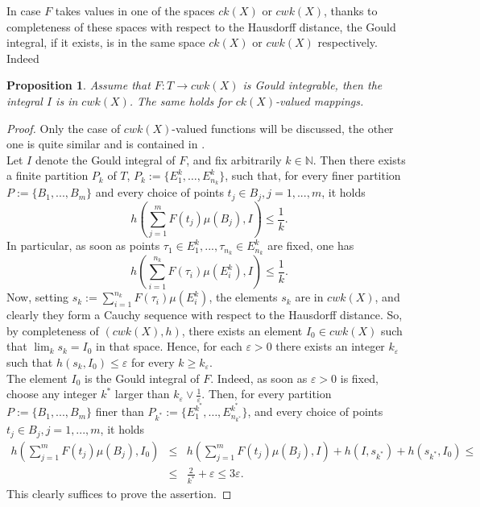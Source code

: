\documentclass[11pt,a4paper,twoside]{amsart}
\newtheorem{proposition}[theorem]{Proposition}
\begin{document}
\noindent In case $F$ takes values in one of the spaces $ck(X)$ or $cwk(X)$, thanks to completeness of these spaces with respect to the Hausdorff distance, the Gould integral, if it exists, is in the same space $ck(X)$ or $cwk(X)$ respectively. Indeed
\begin{proposition}\label{integraleck}
Assume that $F:T\to cwk(X)$ is Gould integrable, then the integral $I$ is in $cwk(X)$. The same holds for $ck(X)$-valued mappings.
\end{proposition}
\begin{proof}
Only the case of $cwk(X)$-valued functions will be discussed, the other one is quite similar and is contained in \cite[Remark 3.7]{pgcsub}.\\
Let $I$ denote the Gould integral of $F$, and fix arbitrarily $k\in \mathbb{N}$. Then there exists a finite partition 
$P_k$ of $T$, $P_k:=\{E_1^k, \ldots, E^k_{n_k}\}$, such that, for every finer partition 
$P:=\{B_1,...,B_m\}$ and every choice of points $t_j\in B_j,j=1,...,m$, it holds
$$h(\sum_{j=1}^mF(t_j)\mu(B_j),I)\leq \frac{1}{k}.$$
In particular, as soon as points $\tau_1\in E^k_1,...,\tau_{n_k}\in E^k_{n_k}$ are fixed, one has
$$h(\sum_{i=1}^{n_k}F(\tau_i)\mu(E^k_i),I)\leq \frac{1}{k}.$$
Now, setting $s_k:=\sum_{i=1}^{n_k}F(\tau_i)\mu(E^k_i)$, the elements $s_k$ are in $cwk(X)$, and clearly they form a Cauchy sequence with respect to the Hausdorff distance. So, by completeness of $(cwk(X),h)$, there exists an element $I_0\in cwk(X)$ such that $\lim_k s_k=I_0$ in that space. Hence, for each ${\varepsilon}>0$ there exists an integer $k_{\varepsilon}$ such that $h(s_k,I_0)\leq {\varepsilon}$ for every $k\geq k_{\varepsilon}$.
\\
The element $I_0$ is the Gould integral of $F$. 
Indeed, as soon as ${\varepsilon}>0$ is fixed, choose any integer $k^*$ larger than $k_{\varepsilon}\vee\frac{1}{\varepsilon}$. Then, for every partition $P:=\{B_1,...,B_m\}$ finer than $P_{k^*}:=\{E_1^{k^*}, \ldots, E^{k^*}_{n_{k^*}}\}$,
 and every choice of points $t_j\in B_j,j=1,...,m$, it holds
\begin{eqnarray*}
h(\sum_{j=1}^mF(t_j)\mu(B_j),I_0) &\leq& h(\sum_{j=1}^mF(t_j)\mu(B_j),
I) + h(I,s_{k^*})+h(s_{k^*},I_0)\leq \\ &\leq&
 \frac{2}{k^*}+{\varepsilon}\leq 3{\varepsilon}.
\end{eqnarray*}
This clearly suffices to prove the assertion.

\end{proof}
\end{document}
